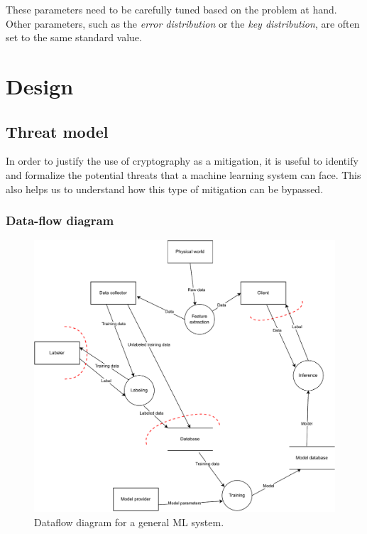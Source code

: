 \documentclass[a4paper,11pt,oneside]{report}
\begin{document}
These parameters need to be carefully tuned based on the problem at hand. 
Other parameters, such as the \emph{error distribution} or the \emph{key distribution}, are often set to the same standard value.


\chapter{Design}



\section{Threat model}

In order to justify the use of cryptography as a mitigation, it is useful to identify and formalize the potential threats that a machine learning system can face. 
This also helps us to understand how this type of mitigation can be bypassed.

\subsection{Data-flow diagram}

\begin{figure}[p]
    \centering
    \includegraphics[width=\textwidth]{figures/dataflow-ml.pdf}
    \caption{Dataflow diagram for a general ML system.}
    \label{fig:dataflow}
\end{figure}
\end{document}
